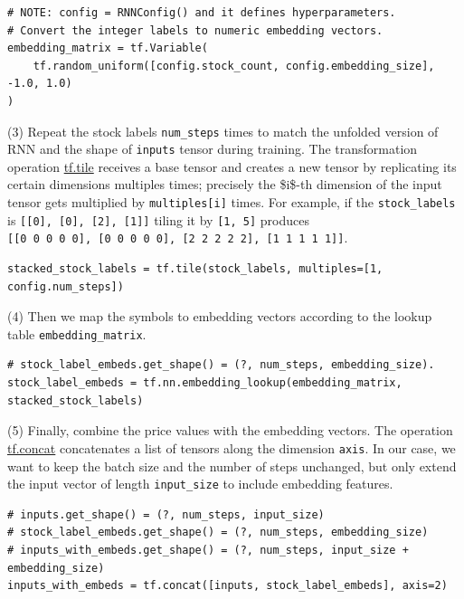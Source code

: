 \begin{verbatim}
# NOTE: config = RNNConfig() and it defines hyperparameters.
# Convert the integer labels to numeric embedding vectors.
embedding_matrix = tf.Variable(
    tf.random_uniform([config.stock_count, config.embedding_size], -1.0, 1.0)
)
\end{verbatim}

(3) Repeat the stock labels \texttt{num\_steps} times to match the unfolded version of RNN and the shape of \texttt{inputs} tensor during training. The transformation operation \href{https://www.tensorflow.org/api_docs/python/tf/tile}{tf.tile} receives a base tensor and creates a new tensor by replicating its certain dimensions multiples times; precisely the \$i\$-th dimension of the input tensor gets multiplied by \texttt{multiples{[}i{]}} times. For example, if the \texttt{stock\_labels} is \texttt{{[}{[}0{]},\ {[}0{]},\ {[}2{]},\ {[}1{]}{]}} tiling it by \texttt{{[}1,\ 5{]}} produces \texttt{{[}{[}0\ 0\ 0\ 0\ 0{]},\ {[}0\ 0\ 0\ 0\ 0{]},\ {[}2\ 2\ 2\ 2\ 2{]},\ {[}1\ 1\ 1\ 1\ 1{]}{]}}.

\begin{verbatim}
stacked_stock_labels = tf.tile(stock_labels, multiples=[1, config.num_steps])
\end{verbatim}

(4) Then we map the symbols to embedding vectors according to the lookup table \texttt{embedding\_matrix}.

\begin{verbatim}
# stock_label_embeds.get_shape() = (?, num_steps, embedding_size).
stock_label_embeds = tf.nn.embedding_lookup(embedding_matrix, stacked_stock_labels)
\end{verbatim}

(5) Finally, combine the price values with the embedding vectors. The operation \href{https://www.tensorflow.org/api_docs/python/tf/concat}{tf.concat} concatenates a list of tensors along the dimension \texttt{axis}. In our case, we want to keep the batch size and the number of steps unchanged, but only extend the input vector of length \texttt{input\_size} to include embedding features.

\begin{verbatim}
# inputs.get_shape() = (?, num_steps, input_size)
# stock_label_embeds.get_shape() = (?, num_steps, embedding_size)
# inputs_with_embeds.get_shape() = (?, num_steps, input_size + embedding_size)
inputs_with_embeds = tf.concat([inputs, stock_label_embeds], axis=2)
\end{verbatim}

